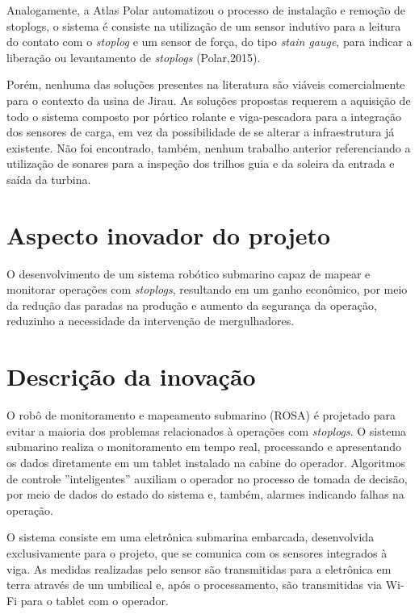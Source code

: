 \begin{itemize}
Analogamente, a Atlas Polar automatizou o processo de instalação e remoção de
stoplogs, o sistema é consiste na utilização de um sensor indutivo para a
leitura do contato com o \textit{stoplog} e um sensor de força, do tipo
\textit{stain gauge}, para indicar a liberação ou levantamento de
\textit{stoplogs} (Polar,2015).

Porém, nenhuma das soluções presentes na literatura são viáveis comercialmente
para o contexto da usina de Jirau. As soluções propostas requerem a aquisição de todo o
sistema composto por pórtico rolante e viga-pescadora para a integração dos
sensores de carga, em vez da possibilidade de se alterar a infraestrutura já
existente.
Não foi encontrado, também, nenhum trabalho anterior referenciando a utilização
de sonares para a inspeção dos trilhos guia e da soleira da entrada e saída da turbina.

\section{Aspecto inovador do projeto}

O desenvolvimento de um sistema robótico submarino capaz de mapear e monitorar
operações com \textit{stoplogs}, resultando em um ganho econômico, por meio da
redução das paradas na produção e aumento da segurança da operação,
reduzinho a necessidade da intervenção de mergulhadores.

\section{Descrição da inovação}

O robô de monitoramento e mapeamento submarino (ROSA) é projetado para evitar a
maioria dos problemas relacionados à operações com \textit{stoplogs}. O sistema
submarino realiza o monitoramento em tempo real, processando e apresentando os
dados diretamente em um tablet instalado na cabine do operador. Algoritmos de
controle ''inteligentes'' auxiliam o operador no processo de tomada de decisão,
por meio de dados do estado do sistema e, também, alarmes indicando falhas na
operação.

O sistema consiste em uma eletrônica submarina embarcada, desenvolvida
exclusivamente para o projeto, que se comunica com os sensores integrados à
viga. As medidas realizadas pelo sensor são transmitidas para a
eletrônica em terra através de um umbilical e, após o processamento, são
transmitidas via Wi-Fi para o tablet com o operador.


\end{itemize}
